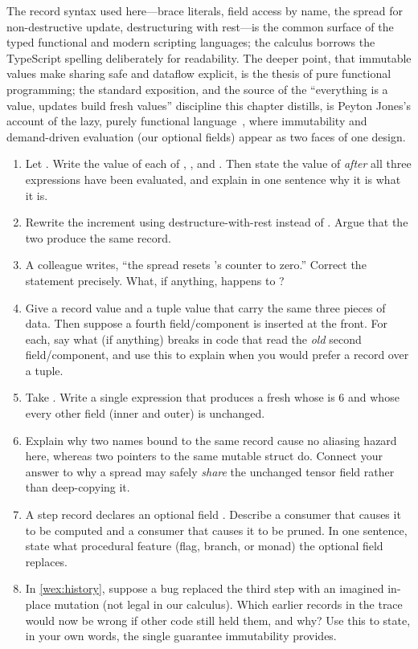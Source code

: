 \furtherreading
The record syntax used here---brace literals, field access by name, the spread
for non-destructive update, destructuring with rest---is the common surface of
the typed functional and modern scripting languages; the calculus borrows the
TypeScript spelling deliberately for readability. The deeper point, that
immutable values make sharing safe and dataflow explicit, is the thesis of pure
functional programming; the standard exposition, and the source of the
``everything is a value, updates build fresh values'' discipline this chapter
distills, is Peyton Jones's account of the lazy, purely functional
language~\citep{peytonjones2003}, where immutability and demand-driven evaluation
(our optional fields) appear as two faces of one design.

\exercisessection
\begin{enumerate}[nosep]
  \item Let .
  Write the value of each of ,
  , and
  . Then state the value of
   \emph{after} all three expressions have been
  evaluated, and explain in one sentence why it is what it is.
  \item Rewrite the increment 
  using destructure-with-rest instead of . Argue
  that the two produce the same record.
  \item A colleague writes, ``the spread 
  resets 's counter to zero.'' Correct the statement precisely. What, if
  anything, happens to ?
  \item Give a record value and a tuple value that carry the same three pieces of
  data. Then suppose a fourth field/component is inserted at the front. For each,
  say what (if anything) breaks in code that read the \emph{old} second
  field/component, and use this to explain when you would prefer a record over a
  tuple.
  \item Take .
  Write a single expression that produces a fresh  whose
   is $6$ and whose every other field (inner and outer) is
  unchanged.
  \item Explain why two names bound to the same record cause no aliasing hazard
  here, whereas two pointers to the same mutable struct do. Connect your answer
  to why a spread may safely \emph{share} the unchanged tensor field 
  rather than deep-copying it.
  \item A step record declares an optional field
  . Describe a consumer that causes it
  to be computed and a consumer that causes it to be pruned. In one sentence,
  state what procedural feature (flag, branch, or monad) the optional field
  replaces.
  \item In \cref{wex:history}, suppose a bug replaced the third step with an
  imagined in-place mutation  (not legal in
  our calculus). Which earlier records in the trace would now be wrong if other
  code still held them, and why? Use this to state, in your own words, the single
  guarantee immutability provides.
\end{enumerate}
